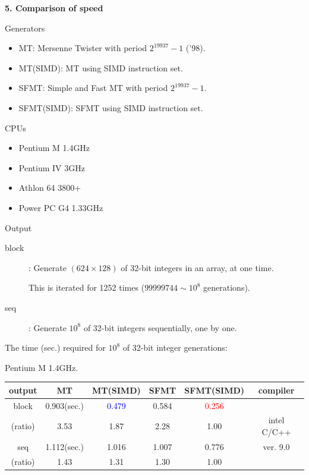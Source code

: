 \documentclass[a4j,12pt,landscape]{jarticle}
\begin{document}
\newpage
\noindent
{\bf 5. Comparison of speed}
\begin{description}
  \item Generators
    \begin{itemize}
    \item MT: Mersenne Twister with period $2^{19937}-1$ ('98).
    \item MT(SIMD): MT using SIMD instruction set.
    \item SFMT: Simple and Fast MT with period $2^{19937}-1$.
    \item SFMT(SIMD): SFMT using SIMD instruction set.
    \end{itemize}
  \item CPUs
    \begin{itemize}
      \item Pentium M 1.4GHz
      \item Pentium IV 3GHz
      \item Athlon 64 3800+
      \item Power PC G4 1.33GHz  
    \end{itemize}
    \newpage
    \item Output
      \begin{description}
      \item[block]: Generate $(624 \times 128)$ of 32-bit integers 
        in an array, at one time. 

        This is iterated for 1252 times 
        ($99999744\sim 10^8$ generations).
      \item[seq]: Generate $10^8$ of 32-bit integers sequentially,
        one by one.
      \end{description}
    \end{description}

\newpage
\begin{center}
The time (sec.) required for $10^8$ 
of 32-bit integer generations:

Pentium M 1.4GHz. 

\vskip 2mm
\begin{tabular}{|c||c|c|c|c|c|}
\hline
output & MT & MT{\Large(SIMD)} & SFMT & SFMT{\Large (SIMD)} & compiler
 \\ \hline \hline
 block   & 0.903(sec.) & \textcolor{blue}{0.479}
 & 0.584 & \textcolor{red}{0.256} &    \\ \cline{2-5}
 (ratio) & 3.53\phantom{0}  & 1.87\phantom{0}  & 2.28\phantom{0}  & 1.00\phantom{0}  & intel C/C++ \\ \cline{1-5}
 seq     & 1.112(sec.) & 1.016 & 1.007 & 0.776 & ver. 9.0\\ \cline{2-5}
 (ratio) & 1.43\phantom{0} & 1.31\phantom{0}  & 1.30\phantom{0}  & 1.00\phantom{0}  &  \\ \hline
\end{tabular}
\end{center}
\end{document}
